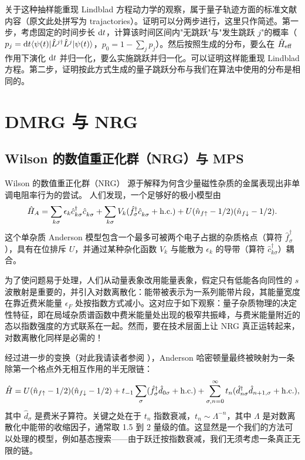 \documentclass[a4paper,10pt,oneside,onecolumn,1p,times]{elsarticle}
\newcommand{\diff}{{\rm d}}
\newcommand{\bra}[1]{\mbox{$\langle #1  |$}}
\newcommand{\ket}[1]{\mbox{$| #1  \rangle$}}
\begin{document}
关于这种抽样能重现 Lindblad 方程动力学的观察，属于量子轨迹方面的标准文献内容（原文此处拼写为 trajactories）。证明可以分两步进行，这里只作简述。第一步，考虑固定的时间步长 $\diff t$，计算该时间区间内"无跳跃"与"发生跳跃 $j$"的概率（$p_j = \diff t \bra{\psi(t)} \hat{L}^{j\dagger} \hat{L}^j \ket{\psi(t)}$，$p_0 = 1 - \sum_j p_j$）。然后按照生成的分布，要么在 $\hat{H}_{{\rm eff}}$ 作用下演化 $\diff t$ 并归一化，要么实施跳跃并归一化。可以证明这样能重现 Lindblad 方程。第二步，证明按此方式生成的量子跳跃分布与我们在算法中使用的分布是相同的。

\section{DMRG 与 NRG}
\subsection{Wilson 的数值重正化群（NRG）与 MPS}
Wilson 的数值重正化群（NRG）\cite{Wilson75,Bulla08,Krishnamurthy80} 源于解释为何含少量磁性杂质的金属表现出非单调电阻率行为的尝试。
人们发现，一个足够好的极小模型由
\begin{equation}
\hat{H}_A = \sum_{k\sigma} \epsilon_k \hat{c}^\dagger_{k\sigma} \hat{c}^{\phantom\dagger}_{k\sigma} + \sum_{k\sigma} V_k (\hat{f}^\dagger_\sigma \hat{c}^{\phantom\dagger}_{k\sigma} + {\rm h.c.}) + U (\hat{n}_{f\uparrow}-1/2) (\hat{n}_{f\downarrow}-1/2).
\end{equation}
这个单杂质 Anderson 模型包含一个最多可被两个电子占据的杂质格点（算符 $\hat{f}^\dagger_\sigma$），具有在位排斥 $U$，并通过某种杂化函数 $V_k$ 与能散为 $\epsilon_k$ 的导带（算符 $\hat{c}^\dagger_{k\sigma}$）耦合。

为了使问题易于处理，人们从动量表象改用能量表象，假定只有低能各向同性的 $s$ 波散射是重要的，并引入对数离散化：能带被表示为一系列能带片段，其能量宽度在靠近费米能量 $\epsilon_F$ 处按指数方式减小。这对应于如下观察：量子杂质物理的决定性特征，即在局域杂质谱函数中费米能量处出现的极窄共振峰，与费米能量附近的态以指数强度的方式联系在一起。然而，要在技术层面上让 NRG 真正运转起来，对数离散化同样是必需的！

经过进一步的变换（对此我请读者参阅 \cite{Wilson75,Bulla08}），Anderson 哈密顿量最终被映射为一条除第一个格点外无相互作用的半无限链：
\begin{equation} 
\hat{H}= U (\hat{n}_{f\uparrow}-1/2) (\hat{n}_{f\downarrow}-1/2) + t_{-1} \sum_\sigma (\hat{f}^\dagger_\sigma \hat{d}_{0\sigma} + {\rm h.c.}) + \sum_{\sigma,n=0}^\infty t_n (\hat{d}^\dagger_{n\sigma} \hat{d}_{n+1,\sigma} + {\rm h.c.}),
\end{equation}
其中 $\hat{d}_{\sigma}$ 是费米子算符。关键之处在于 $t_n$ 指数衰减，$t_n \sim \Lambda^{-n}$，其中 $\Lambda$ 是对数离散化中能带的收缩因子，通常取 1.5 到 2 量级的值。这显然是一个我们的方法可以处理的模型，例如基态搜索——由于跃迁按指数衰减，我们无须考虑一条真正无限的链。
\end{document}
